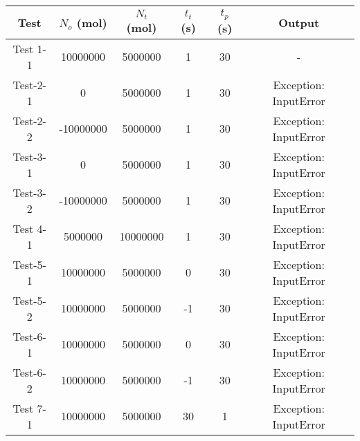 \documentclass[12pt, titlepage]{article}
\begin{document}
\begin{center}
 \begin{tabular}{|| c||c c c c|| c ||} 
 \hline
 Test &$N_{o}$ (mol) & $N_{t}$ (mol) & $t_{t}$ (\si{\second}) & $t_{p}$ 
(\si{\second}) & Output\\ [0.5ex] 
 \hline
 Test 1-1 & 10000000 & 5000000 & 1 & 30 & - \\ 
 \hline
 Test-2-1 & 0 & 5000000 & 1 & 30 & Exception: InputError\\
 \hline
 Test-2-2 & -10000000 & 5000000 & 1 & 30 & Exception: InputError\\
 \hline
 Test-3-1 & 0 & 5000000 & 1 & 30 & Exception: InputError\\
 \hline
 Test-3-2 & -10000000 & 5000000 & 1 & 30 & Exception: InputError\\ 
 \hline
 Test 4-1 & 5000000 & 10000000 & 1 & 30 & Exception: InputError\\ 
 \hline
 Test-5-1 & 10000000 & 5000000 & 0 & 30 & Exception: InputError\\
 \hline
 Test-5-2 & 10000000 & 5000000 & -1 & 30 & Exception: InputError\\
 \hline
 Test-6-1 & 10000000 & 5000000 & 0 & 30 & Exception: InputError\\
 \hline
 Test-6-2 & 10000000 & 5000000 & -1 & 30 & Exception: InputError\\ 
 \hline
 Test 7-1 & 10000000 & 5000000 & 30 & 1 & Exception: InputError\\  [1ex] 
 \hline

\end{tabular}
\end{center}
\end{document}
